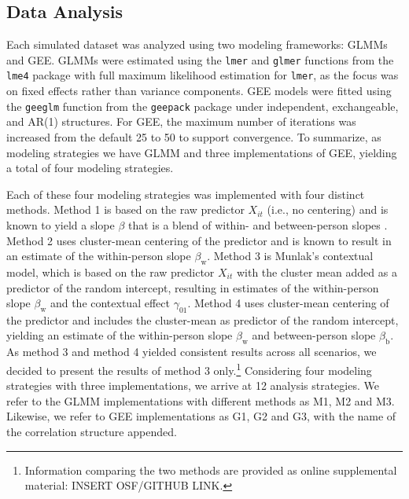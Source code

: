 \subsection{Data Analysis}

Each simulated dataset was analyzed using two modeling frameworks: GLMMs and GEE. GLMMs were estimated using the \texttt{lmer} and \texttt{glmer} functions from the \texttt{lme4} package \parencite{bates_fitting_2015} with full maximum likelihood estimation for \texttt{lmer}, as the focus was on fixed effects rather than variance components. GEE models were fitted using the \texttt{geeglm} function from the \texttt{geepack} package \parencite{halekoh_r_2006} under independent, exchangeable, and AR(1) structures. For GEE, the maximum number of iterations was increased from the default 25 to 50 to support convergence. To summarize, as modeling strategies we have GLMM and three implementations of GEE, yielding a total of four modeling strategies.

Each of these four modeling strategies was implemented with four distinct methods. Method 1 is based on the raw predictor $X_{it}$ (i.e., no centering) and is known to yield a slope $\beta$ that is a blend of within- and between-person slopes \parencite[]{raudenbush_hierarchical_2002}. Method 2 uses cluster-mean centering of the predictor and is known to result in an estimate of the within-person slope $\beta_\text{w}$. Method 3 is Munlak's contextual model, which is based on the raw predictor $X_{it}$ with the cluster mean added as a predictor of the random intercept, resulting in estimates of the within-person slope $\beta_\text{w}$ and the contextual effect $\gamma_{01}$. Method 4 uses cluster-mean centering of the predictor and includes the cluster-mean as predictor of the random intercept, yielding an estimate of the within-person slope $\beta_\text{w}$ and between-person slope $\beta_\text{b}$. As method 3 and method 4 yielded consistent results across all scenarios, we decided to present the results of method 3 only.\footnote{Information comparing the two methods are provided as online supplemental material: INSERT OSF/GITHUB LINK.} Considering four modeling strategies with three implementations, we arrive at 12 analysis strategies. We refer to the GLMM implementations with different methods as M1, M2 and M3. Likewise, we refer to GEE implementations as G1, G2 and G3, with the name of the correlation structure appended.

